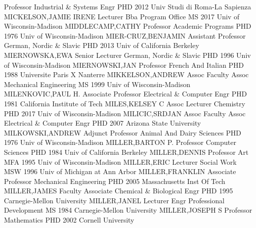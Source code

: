 \documentclass[
]{article}
\begin{document}
Professor \textbar{}  \textbar Industrial \& Systems Engr
\textbar PHD 2012 Univ Studi di Roma-La Sapienza
\textbar MICKELSON,JAMIE IRENE \textbar Lecturer \textbar{} 
\textbar Bba Program Office \textbar MS 2017 Univ of Wisconsin-Madison
\textbar MIDDLECAMP,CATHY \textbar Professor \textbar{} 
\textbar Academic Programs \textbar PHD 1976 Univ of Wisconsin-Madison
\textbar MIER-CRUZ,BENJAMIN \textbar Assistant Professor \textbar{}
 \textbar German, Nordic \& Slavic \textbar PHD 2013 Univ of
California Berkeley \textbar MIERNOWSKA,EWA \textbar Senior Lecturer
\textbar{}  \textbar German, Nordic \& Slavic \textbar PHD
1996 Univ of Wisconsin-Madison \textbar MIERNOWSKI,JAN
\textbar Professor \textbar{}  \textbar French And Italian
\textbar PHD 1988 Universite Paris X Nanterre \textbar MIKKELSON,ANDREW
\textbar Assoc Faculty Assoc \textbar{}  \textbar Mechanical
Engineering \textbar MS 1999 Univ of Wisconsin-Madison
\textbar MILENKOVIC,PAUL H. \textbar Associate Professor \textbar{}
 \textbar Electrical \& Computer Engr \textbar PHD 1981
California Institute of Tech \textbar MILES,KELSEY C \textbar Assoc
Lecturer \textbar{}  \textbar Chemistry \textbar PHD 2017
Univ of Wisconsin-Madison \textbar MILICIC,SRDJAN \textbar Assoc Faculty
Assoc \textbar{}  \textbar Electrical \& Computer Engr
\textbar PHD 2007 Arizona State University \textbar MILKOWSKI,ANDREW
\textbar Adjunct Professor \textbar{}  \textbar Animal And
Dairy Sciences \textbar PHD 1976 Univ of Wisconsin-Madison
\textbar MILLER,BARTON P. \textbar Professor \textbar{} 
\textbar Computer Sciences \textbar PHD 1984 Univ of California Berkeley
\textbar MILLER,DENNIS \textbar Professor \textbar{} 
\textbar Art \textbar MFA 1995 Univ of Wisconsin-Madison
\textbar MILLER,ERIC \textbar Lecturer \textbar{} 
\textbar Social Work \textbar MSW 1996 Univ of Michigan at Ann Arbor
\textbar MILLER,FRANKLIN \textbar Associate Professor \textbar{}
 \textbar Mechanical Engineering \textbar PHD 2005
Massachusetts Inst Of Tech \textbar MILLER,JAMES \textbar Faculty
Associate \textbar{}  \textbar Chemical \& Biological Engr
\textbar PHD 1995 Carnegie-Mellon University \textbar MILLER,JANEL
\textbar Lecturer \textbar{}  \textbar Engr Professional
Development \textbar MS 1984 Carnegie-Mellon University
\textbar MILLER,JOSEPH S \textbar Professor \textbar{} 
\textbar Mathematics \textbar PHD 2002 Cornell University
\end{document}
